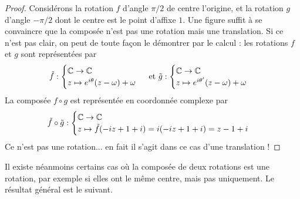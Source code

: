 \begin{proof}
Considérons la rotation $f$ d'angle $\pi/2$ de centre l'origine, et la rotation $g$ d'angle $-\pi/2$ dont le centre est le point d'affixe $1$. Une figure suffit à se convaincre que la composée n'est pas une rotation mais une translation. Si ce n'est pas clair, on peut de toute façon le démontrer par le calcul : les rotations $f$ et $g$ sont représentées par 
\[
\tilde f : \begin{cases}\mathbb{C}\to\mathbb{C}\\z\mapsto e^{i\theta}(z-\omega)+\omega\end{cases}
\text{ et }
\tilde g : \begin{cases}\mathbb{C}\to\mathbb{C}\\z\mapsto e^{i\theta'}(z-\omega)+\omega\end{cases}
\]
La composée $f\circ g$ est représentée en coordonnée complexe par
\[
\tilde f\circ \tilde g : \begin{cases}\mathbb{C} \to \mathbb{C}\\ z\mapsto \tilde f (-iz+1+i) = i(-iz+1+i) = z-1+i\end{cases} 
\]
Ce n'est pas une rotation... en fait il s'agit dans ce cas d'une translation !
\end{proof}

Il existe néanmoins certains cas où la composée de deux rotations est une rotation, par exemple si elles ont le même centre, mais pas uniquement. Le résultat général est le suivant.

